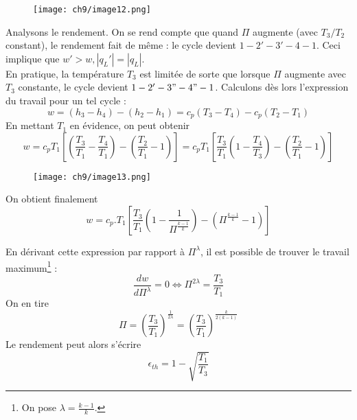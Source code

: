 	\newpage
			\begin{wrapfigure}[12]{l}{4.5cm}
	\texttt{[image: ch9/image12.png]}
		\end{wrapfigure}			
	Analysons le rendement. On se rend compte que quand $\Pi$ augmente (avec $T_3/T_2$ constant), 
	le rendement fait de même : le cycle devient $1-2'-3'-4-1$. Ceci implique que $w'>w, |q_L'|=|q_L|$.\\
	En pratique, la température $T_3$ est limitée de sorte que lorsque $\Pi$ augmente avec 
	$T_3$ constante, le cycle devient $1-2'-3"-4"-1$. Calculons dès lors l'expression du 
	travail pour un tel cycle :
	\begin{equation}
	w = (h_3-h_4)-(h_2-h_1) = c_p(T_3-T_4)-c_p(T_2-T_1)
	\end{equation}
	En mettant $T_1$ en évidence, on peut obtenir
	\begin{equation}
	w = c_pT_1\left[\left(\dfrac{T_3}{T_1}-\dfrac{T_4}{T_1}\right)-\left(\dfrac{T_2}{T_1}-1\right)
	\right] = 
	c_pT_1\left[\dfrac{T_3}{T_1}\left(1-\dfrac{T_4}{T_3}\right)-\left(\dfrac{T_2}{T_1}-1\right)
	\right]
	\end{equation}
					\begin{wrapfigure}[10]{r}{6.5cm}
					\vspace{-5mm}
	\texttt{[image: ch9/image13.png]}
		\end{wrapfigure}
	On obtient finalement
	\begin{equation}
	w = c_p.T_1\left[\dfrac{T_3}{T_1}\left(1-\dfrac{1}{\Pi^{\frac{k-1}{k}}}\right)-\left(
	\Pi^{\frac{k-1}{k}}-1\right)\right]
	\end{equation}

	En dérivant cette expression par rapport à $\Pi^\lambda$, il est possible de trouver le 
	travail maximum\footnote{On pose $\lambda = \frac{k-1}{k}$.} :
	\begin{equation}
	\dfrac{dw}{d\Pi^\lambda} = 0 \Leftrightarrow \Pi^{2\lambda} = \dfrac{T_3}{T_1}
	\end{equation}
	On en tire 
	\begin{equation}
	\Pi = \left(\dfrac{T_3}{T_1}\right)^{\frac{1}{2\lambda}} = \left(\dfrac{T_3}{T_1}\right)^{
	\frac{k}{2(k-1)}}
	\end{equation}
	Le rendement peut alors s'écrire 
	\begin{equation}
	\epsilon_{th} = 1-\sqrt{\dfrac{T_1}{T_3}}
	\end{equation}
	
